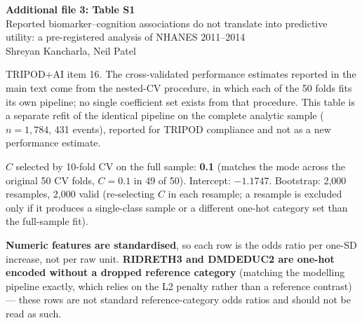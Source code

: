 \documentclass[11pt]{article}
\title{}
\date{}
\begin{document}
\begin{center}
{\large\bfseries Additional file 3: Table S1}\\[2pt]
{\small Reported biomarker--cognition associations do not translate into predictive utility: a pre-registered analysis of NHANES 2011--2014}\\[2pt]
{\small Shreyan Kancharla, Neil Patel}
\end{center}

\bigskip

TRIPOD+AI item 16. The cross-validated performance estimates reported in the main text come from the nested-CV procedure, in which each of the 50 folds fits its own pipeline; no single coefficient set exists from that procedure. This table is a separate refit of the identical pipeline on the complete analytic sample ($n=1{,}784$, 431 events), reported for TRIPOD compliance and not as a new performance estimate.

$C$ selected by 10-fold CV on the full sample: \textbf{0.1} (matches the mode across the original 50 CV folds, $C=0.1$ in 49 of 50). Intercept: $-1.1747$. Bootstrap: 2,000 resamples, 2,000 valid (re-selecting $C$ in each resample; a resample is excluded only if it produces a single-class sample or a different one-hot category set than the full-sample fit).

\textbf{Numeric features are standardised}, so each row is the odds ratio per one-SD increase, not per raw unit. \textbf{RIDRETH3 and DMDEDUC2 are one-hot encoded without a dropped reference category} (matching the modelling pipeline exactly, which relies on the L2 penalty rather than a reference contrast) --- these rows are not standard reference-category odds ratios and should not be read as such.

\footnotesize
\end{document}
